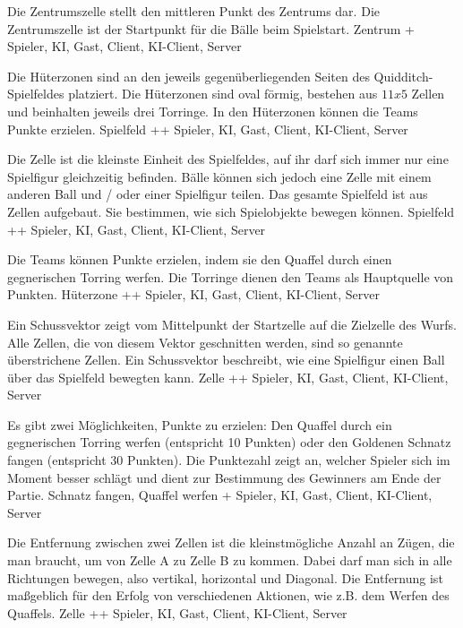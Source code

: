         {Die Zentrumszelle stellt den mittleren Punkt des Zentrums dar.}
        {Die Zentrumszelle ist der Startpunkt für die Bälle beim Spielstart.}
        {Zentrum}
        {+}
        {Spieler, KI, Gast, Client, KI-Client, Server}

        {Die Hüterzonen sind an den jeweils gegenüberliegenden Seiten des Quidditch-Spielfeldes platziert. Die Hüterzonen sind oval förmig, bestehen aus $11x5$ Zellen und beinhalten jeweils drei Torringe.}
        {In den Hüterzonen können die Teams Punkte erzielen.}
        {Spielfeld}
        {++}
        {Spieler, KI, Gast, Client, KI-Client, Server}
        
        {Die Zelle ist die kleinste Einheit des Spielfeldes, auf ihr darf sich immer nur eine Spielfigur gleichzeitig befinden. Bälle können sich jedoch eine Zelle mit einem anderen Ball und / oder einer Spielfigur teilen.}
        {Das gesamte Spielfeld ist aus Zellen aufgebaut. Sie bestimmen, wie sich Spielobjekte bewegen können.}
        {Spielfeld}
        {++}
        {Spieler, KI, Gast, Client, KI-Client, Server}

        {Die Teams können Punkte erzielen, indem sie den Quaffel durch einen gegnerischen Torring werfen.}
        {Die Torringe dienen den Teams als Hauptquelle von Punkten.}
        {Hüterzone}
        {++}
        {Spieler, KI, Gast, Client, KI-Client, Server}
        
        {Ein Schussvektor zeigt vom Mittelpunkt der Startzelle auf die Zielzelle des Wurfs. Alle Zellen, die von diesem Vektor geschnitten werden, sind so genannte überstrichene Zellen.}
        {Ein Schussvektor beschreibt, wie eine Spielfigur einen Ball über das Spielfeld bewegten kann.}
        {Zelle}
        {++}
        {Spieler, KI, Gast, Client, KI-Client, Server}
        
        {Es gibt zwei Möglichkeiten, Punkte zu erzielen: Den Quaffel durch ein gegnerischen Torring werfen (entspricht 10 Punkten) oder den Goldenen Schnatz fangen (entspricht 30 Punkten).}
        {Die Punktezahl zeigt an, welcher Spieler sich im Moment besser schlägt und dient zur Bestimmung des Gewinners am Ende der Partie.}
        {Schnatz fangen, Quaffel werfen}
        {+}
        {Spieler, KI, Gast, Client, KI-Client, Server}

        {Die Entfernung zwischen zwei Zellen ist die kleinstmögliche Anzahl an Zügen, die man braucht, um von Zelle A zu Zelle B zu kommen. Dabei darf  man sich in alle Richtungen bewegen, also vertikal, horizontal und Diagonal.}
        {Die Entfernung ist maßgeblich für den Erfolg von verschiedenen Aktionen, wie z.B. dem Werfen des Quaffels.}
        {Zelle}
        {++}
        {Spieler, KI, Gast, Client, KI-Client, Server}

